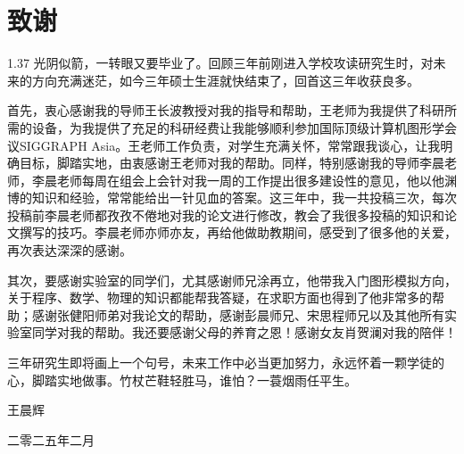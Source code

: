 {\kaishu
\chapter*{致\qquad 谢}
\begin{spacing}{1.37}
	光阴似箭，一转眼又要毕业了。回顾三年前刚进入学校攻读研究生时，对未来的方向充满迷茫，如今三年硕士生涯就快结束了，回首这三年收获良多。

	首先，衷心感谢我的导师王长波教授对我的指导和帮助，王老师为我提供了科研所需的设备，为我提供了充足的科研经费让我能够顺利参加国际顶级计算机图形学会议SIGGRAPH Asia。王老师工作负责，对学生充满关怀，常常跟我谈心，让我明确目标，脚踏实地，由衷感谢王老师对我的帮助。同样，特别感谢我的导师李晨老师，李晨老师每周在组会上会针对我一周的工作提出很多建设性的意见，他以他渊博的知识和经验，常常能给出一针见血的答案。这三年中，我一共投稿三次，每次投稿前李晨老师都孜孜不倦地对我的论文进行修改，教会了我很多投稿的知识和论文撰写的技巧。李晨老师亦师亦友，再给他做助教期间，感受到了很多他的关爱，再次表达深深的感谢。

	其次，要感谢实验室的同学们，尤其感谢师兄涂再立，他带我入门图形模拟方向，关于程序、数学、物理的知识都能帮我答疑，在求职方面也得到了他非常多的帮助；感谢张健阳师弟对我论文的帮助，感谢彭晨师兄、宋思程师兄以及其他所有实验室同学对我的帮助。我还要感谢父母的养育之恩！感谢女友肖贺澜对我的陪伴！

	三年研究生即将画上一个句号，未来工作中必当更加努力，永远怀着一颗学徒的心，脚踏实地做事。竹杖芒鞋轻胜马，谁怕？一蓑烟雨任平生。


\end{spacing}

\vspace{0cm} \hspace{10cm} 

\hfill  王晨辉 \hspace{0cm}

\hfill  二零二五年二月 \hspace{0cm}
}
